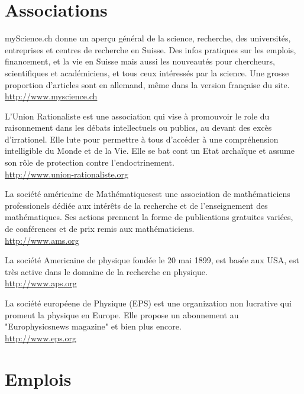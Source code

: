 	\section{Associations}

		{\Large {}} myScience.ch donne un aperçu général de la science, recherche, des universités, entreprises et centres de recherche en Suisse. Des infos pratiques sur les emplois, financement, et la vie en Suisse mais aussi les nouveautés pour chercheurs, scientifiques et académiciens, et tous ceux intéressés par la science. Une grosse proportion d'articles sont en allemand, même dans la version française du site.\\
		\href{http://www.myscience.ch}{\color{blue}http://www.myscience.ch}
		
		{\Large {}}{\Large {}}{\Large {}}\bcdfrance{} L'Union Rationaliste est une association qui vise à promouvoir le role du raisonnement dans les débats intellectuels ou publics, au devant des excès d'irrationel. Elle lute pour permettre à tous d'accéder à une compréhension intelligible du Monde et de la Vie. Elle se bat cont un Etat archaïque et assume son rôle de protection contre l'endoctrinement.\\
		\href{http://www.union-rationaliste.org}{\color{blue}http://www.union-rationaliste.org}
		
		{\Large {}}{\Large {}} La société américaine de Mathématiquesest une association de mathématiciens professionels dédiée aux intérêts de la recherche et de l'enseignement des mathématiques. Ses actions prennent la forme de publications gratuites variées, de conférences et de prix remis aux mathématiciens.\\
		\href{http://www.ams.org}{\color{blue}http://www.ams.org}
		
		{\Large {}}{\Large {}} La société Americaine de physique fondée le 20 mai 1899, est basée aux USA, est très active dans le domaine de la recherche en physique.\\
		\href{http://www.aps.org}{\color{blue}http://www.aps.org}
		
		{\Large {}}{\Large {}}{\Large {}} La société européene de Physique (EPS) est une organization non lucrative qui promeut la physique en Europe. Elle propose un abonnement au "Europhysicsnews magazine" et bien plus encore.\\
		\href{http://www.eps.org}{\color{blue}http://www.eps.org}

	\pagebreak
	\section{Emplois}
	
